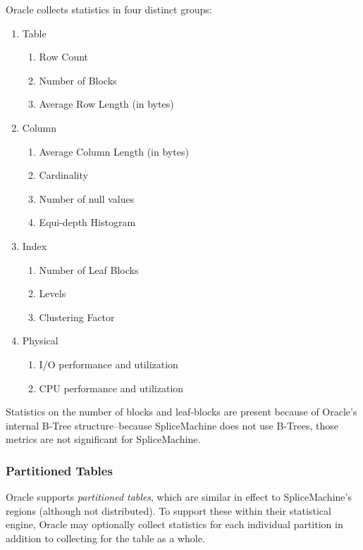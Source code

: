 Oracle collects statistics in four distinct groups\cite{Oracle}:
\begin{enumerate}
				\item Table
								\begin{enumerate}
												\item	Row Count
												\item Number of Blocks
												\item Average Row Length (in bytes)
								\end{enumerate}
				\item Column
								\begin{enumerate}
												\item Average Column Length (in bytes)
												\item Cardinality
												\item Number of null values
												\item Equi-depth Histogram
								\end{enumerate}
				\item Index
								\begin{enumerate}
												\item Number of Leaf Blocks
												\item Levels
												\item Clustering Factor
								\end{enumerate}
				\item Physical
								\begin{enumerate}
												\item I/O performance and utilization
												\item CPU performance and utilization
								\end{enumerate}
\end{enumerate}
Statistics on the number of blocks and leaf-blocks are present because of Oracle's internal B-Tree structure--because SpliceMachine does not use B-Trees, those metrics are not significant for SpliceMachine.

\subsubsection{Partitioned Tables}
Oracle supports \emph{partitioned tables}, which are similar in effect to SpliceMachine's regions (although not distributed). To support these within their statistical engine, Oracle may optionally collect statistics for each individual partition in addition to collecting for the table as a whole\cite{Oracle}. 

